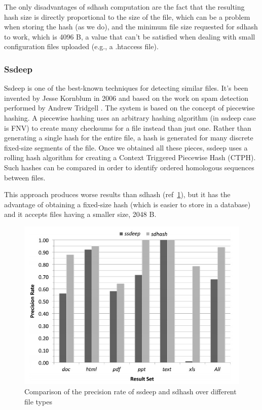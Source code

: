 The only disadvantages of sdhash computation are the fact that the resulting hash size is directly proportional to the size of the file, which can be a problem when storing the hash (as we do), and the minimum file size requested for sdhash to work, which is 4096 B, a value that can't be satisfied when dealing with small configuration files uploaded (e.g., a .htaccess file).

\subsubsection{Ssdeep}
Ssdeep is one of the best-known techniques for detecting similar files. It's been invented by Jesse Kornblum \cite{ssdeep} in 2006 and based on the work on spam detection performed by Andrew Tridgell \cite{spamsum}.
The system is based on the concept of piecewise hashing. A piecewise hashing uses an arbitrary hashing algorithm (in ssdeep case is FNV) to create many checksums for a file instead than just one. Rather than generating a single hash for the entire file, a hash is generated for many discrete fixed-size segments of the file. Once we obtained all these pieces, ssdeep uses a rolling hash algorithm for creating a Context Triggered Piecewise Hash (CTPH). Such hashes can be compared in order to identify ordered homologous sequences between files.

This approach produces worse results than sdhash (ref~\ref{fig:sdhash_ssdeep}), but it has the advantage of obtaining a fixed-size hash (which is easier to store in a database) and it accepts files having a smaller size, 2048 B.

\begin{figure}[tbh]
\centerline{\includegraphics[scale=0.9]{Images/sdhash_ssdeep.jpg}}
\caption{Comparison of the precision rate of ssdeep and sdhash over different file types\label{fig:sdhash_ssdeep}}
\end{figure}


